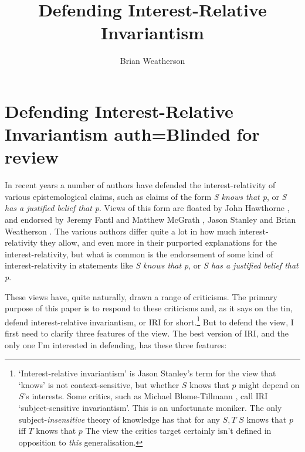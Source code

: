 \documentclass[11pt,oneside]{book}
\title{Defending Interest-Relative Invariantism}
\author{Brian Weatherson}
\begin{document}



\setcounter{paper}{0}

\chapter[Defending Interest-Relative Invariantism]{Defending Interest-Relative Invariantism auth=Blinded for review}

In recent years a number of authors have defended the interest-relativity of various epistemological claims, such as claims of the form \textit{S knows that p}, or \textit{S has a justified belief that p}. Views of this form are floated by John Hawthorne \citeyearpar{Hawthorne2004}, and endorsed by Jeremy Fantl and Matthew McGrath \citeyearpar{Fantl2002, FantlMcGrath2009}, Jason Stanley \cite{Stanley2005-STAKAP} and Brian Weatherson \citeyearpar{Weatherson2005-WEACWD}. The various authors differ quite a lot in how much interest-relativity they allow, and even more in their purported explanations for the interest-relativity, but what is common is the endorsement of some kind of interest-relativity in statements like  \textit{S knows that p}, or \textit{S has a justified belief that p}.

These views have, quite naturally, drawn a range of criticisms. The primary purpose of this paper is to respond to these criticisms and, as it says on the tin, defend interest-relative invariantism, or IRI for short.\footnote{`Interest-relative invariantism' is Jason Stanley's term for the view that `knows' is not context-sensitive, but whether $S$ knows that $p$ might depend on $S$'s interests. Some critics, such as Michael Blome-Tillmann \citeyearpar{MBT2009}, call IRI `subject-sensitive invariantism'. This is an unfortunate moniker. The only subject-\textit{insensitive} theory of knowledge has that for any \(S, T\) \(S\) knows that \(p\) iff \(T\) knows that \(p\) The view the critics target certainly isn't defined in opposition to \textit{this} generalisation.} But to defend the view, I first need to clarify three features of the view. The best version of IRI, and the only one I'm interested in defending, has these three features:
\end{document}

